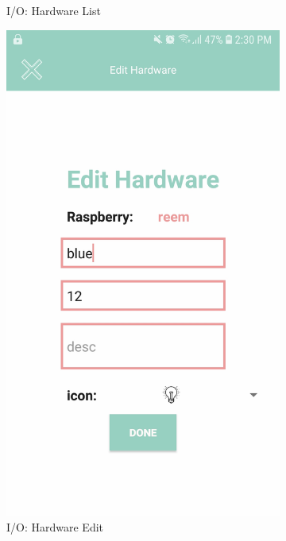 \documentclass[12pt, oneside, a4paper]{book}
\begin{document}
\begin{figure}[H]
\begin{subfigure}[b]{.35\linewidth}
				\caption{I/O: Hardware List}
			\end{subfigure}
			\begin{subfigure}[b]{.35\linewidth}
				\includegraphics[width=\linewidth]{img/output_hardware_edit.jpg}
				\caption{I/O: Hardware Edit}
			\end{subfigure}
			\begin{subfigure}[b]{.35\linewidth}

\end{subfigure}
\end{figure}
\end{document}
